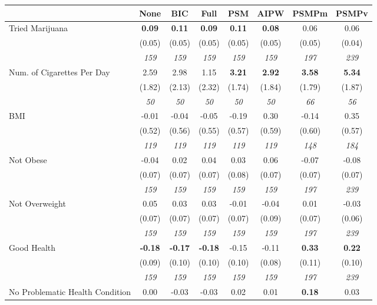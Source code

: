 \begin{tabular}{l c c c c c c c}
\toprule
 & None & BIC & Full & PSM & AIPW & PSMPm & PSMPv \\
\midrule
Tried Marijuana & \textbf{ 0.09 } & \textbf{ 0.11 } & \textbf{ 0.09 } & \textbf{0.11} & \textbf{0.08} & 0.06 & 0.06 \\
& (0.05) & (0.05) & (0.05) & (0.05) & (0.05) & (0.05) & (0.04) \\
& \textit{ 159 } & \textit{ 159 } & \textit{ 159 } & \textit{ 159 } & \textit{ 159 } & \textit{ 197 } & \textit{ 239 } \\
Num. of Cigarettes Per Day & 2.59 & 2.98 & 1.15 & \textbf{3.21} & \textbf{2.92} & \textbf{3.58} & \textbf{5.34} \\
& (1.82) & (2.13) & (2.32) & (1.74) & (1.84) & (1.79) & (1.87) \\
& \textit{ 50 } & \textit{ 50 } & \textit{ 50 } & \textit{ 50 } & \textit{ 50 } & \textit{ 66 } & \textit{ 56 } \\
BMI & -0.01 & -0.04 & -0.05 & -0.19 & 0.30 & -0.14 & 0.35 \\
& (0.52) & (0.56) & (0.55) & (0.57) & (0.59) & (0.60) & (0.57) \\
& \textit{ 119 } & \textit{ 119 } & \textit{ 119 } & \textit{ 119 } & \textit{ 119 } & \textit{ 148 } & \textit{ 184 } \\
Not Obese & -0.04 & 0.02 & 0.04 & 0.03 & 0.06 & -0.07 & -0.08 \\
& (0.07) & (0.07) & (0.07) & (0.08) & (0.07) & (0.07) & (0.07) \\
& \textit{ 159 } & \textit{ 159 } & \textit{ 159 } & \textit{ 159 } & \textit{ 159 } & \textit{ 197 } & \textit{ 239 } \\
Not Overweight & 0.05 & 0.03 & 0.03 & -0.01 & -0.04 & 0.01 & -0.03 \\
& (0.07) & (0.07) & (0.07) & (0.07) & (0.09) & (0.07) & (0.06) \\
& \textit{ 159 } & \textit{ 159 } & \textit{ 159 } & \textit{ 159 } & \textit{ 159 } & \textit{ 197 } & \textit{ 239 } \\
Good Health & \textbf{ -0.18 } & \textbf{ -0.17 } & \textbf{ -0.18 } & -0.15 & -0.11 & \textbf{0.33} & \textbf{0.22} \\
& (0.09) & (0.10) & (0.10) & (0.10) & (0.08) & (0.11) & (0.10) \\
& \textit{ 159 } & \textit{ 159 } & \textit{ 159 } & \textit{ 159 } & \textit{ 159 } & \textit{ 197 } & \textit{ 239 } \\
No Problematic Health Condition & 0.00 & -0.03 & -0.03 & 0.02 & 0.01 & \textbf{0.18} & 0.03 \\

\end{tabular}
